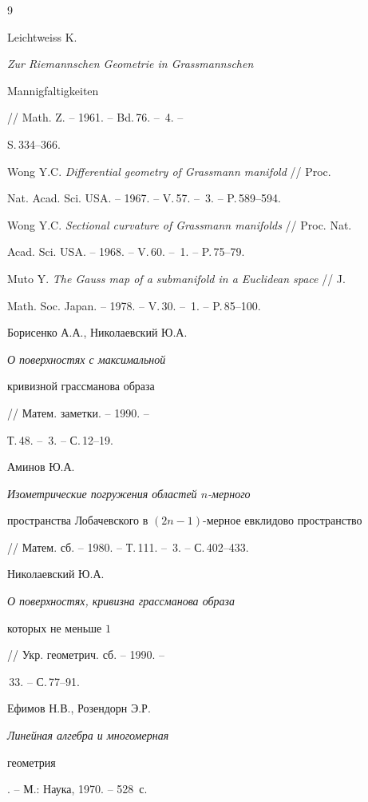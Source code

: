\vskip 1cm





\begin{thebibliography}{9}







Leichtweiss K. {\em Zur Riemannschen Geometrie in Grassmannschen


Mannigfaltigkeiten} // Math. Z. -- 1961. -- Bd.\,76. -- \No\,4. -- 


S.\,334--366.




Wong Y.C. {\em Differential geometry of Grassmann manifold} // Proc.


Nat. Acad. Sci. USA. -- 1967. -- V.\,57. -- \No\,3. -- P.\,589--594.




Wong Y.C. {\em Sectional curvature of Grassmann manifolds} // Proc. Nat.


Acad. Sci. USA. -- 1968. -- V.\,60. -- \No\,1. -- P.\,75--79.




Muto Y. {\em The Gauss map of a submanifold in a Euclidean space} // J.


Math. Soc. Japan. -- 1978. -- V.\,30. -- \No\,1. -- P.\,85--100.




Борисенко А.А., Николаевский Ю.А. {\em О поверхностях с максимальной


кривизной грассманова образа} // Матем. заметки. -- 1990. --


Т.\,48. -- \No\,3. -- С.\,12--19.




Аминов Ю.А. {\em Изометрические погружения областей $n$-мерного


пространства Лобачевского в $(2n-1)$-мерное евклидово пространство}


// Матем. сб. -- 1980. -- Т.\,111. -- \No\,3. -- С.\,402--433.




Николаевский Ю.А. {\em О поверхностях, кривизна грассманова образа


которых не меньше $1$} // Укр. геометрич. сб. -- 1990. --


\No\,33. -- С.\,77--91.




Ефимов Н.В., Розендорн Э.Р. {\em Линейная алгебра и многомерная


геометрия}. -- М.: Наука, 1970. -- 528~с.





\end{thebibliography}





\vskip 0.5cm












\label{end}





